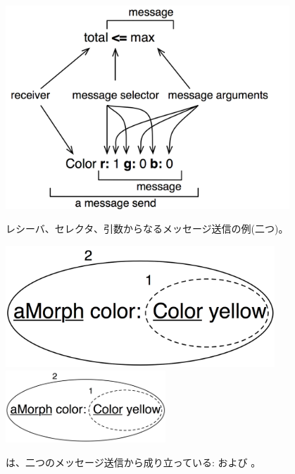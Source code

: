 \documentclass[a4paper,10pt,twoside]{book}
\begin{document}
\begin{figure}[htb]
\begin{minipage}{0.53\textwidth}
	\begin{center}
	\includegraphics[width=0.95\textwidth]{message}
	\caption{レシーバ、セレクタ、引数からなるメッセージ送信の例(二つ)。}\end{center}
\end{minipage}
\hfill
\begin{minipage}{0.43\textwidth}
	\begin{center}
	\ifluluelse
		{\includegraphics[width=0.9\textwidth]{uKeyUnOne}}
		{\includegraphics[width=6cm]{uKeyUnOne}}
	\caption{ は、二つのメッセージ送信から成り立っている:  および 。}
	\end{center}
\end{minipage}
\end{figure}
\end{document}
